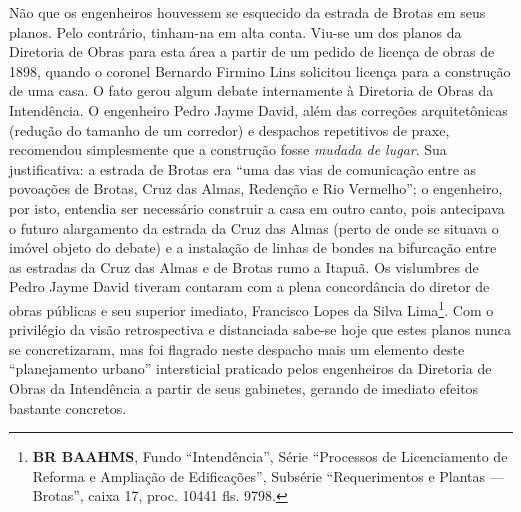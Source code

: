 Não que os engenheiros houvessem se esquecido da estrada de Brotas em seus planos. Pelo contrário, tinham-na em alta conta. Viu-se um dos planos da Diretoria de Obras para esta área a partir de um pedido de licença de obras de 1898, quando o coronel Bernardo Firmino Lins solicitou licença para a construção de uma casa. O fato gerou algum debate internamente à Diretoria de Obras da Intendência. O engenheiro Pedro Jayme David, além das correções arquitetônicas (redução do tamanho de um corredor) e despachos repetitivos de praxe, recomendou simplesmente que a construção fosse \textit{mudada de lugar}. Sua justificativa: a estrada de Brotas era ``uma das vias de comunicação entre as povoações de Brotas, Cruz das Almas, Redenção e Rio Vermelho''; o engenheiro, por isto, entendia ser necessário construir a casa em outro canto, pois antecipava o futuro alargamento da estrada da Cruz das Almas (perto de onde se situava o imóvel objeto do debate) e a instalação de linhas de bondes na bifurcação entre as estradas da Cruz das Almas e de Brotas rumo a Itapuã. Os vislumbres de Pedro Jayme David tiveram contaram com a plena concordância do diretor de obras públicas e seu superior imediato, Francisco Lopes da Silva Lima\footnote{\textbf{BR BAAHMS}, Fundo ``Intendência'', Série ``Processos de Licenciamento de Reforma e Ampliação de Edificações'', Subsérie ``Requerimentos e Plantas --- Brotas'', caixa 17, proc. 10441 fls. 9798.}. Com o privilégio da visão retrospectiva e distanciada sabe-se hoje que estes planos nunca se concretizaram, mas foi flagrado neste despacho mais um elemento deste ``planejamento urbano'' intersticial praticado pelos engenheiros da Diretoria de Obras da Intendência a partir de seus gabinetes, gerando de imediato efeitos bastante concretos.


